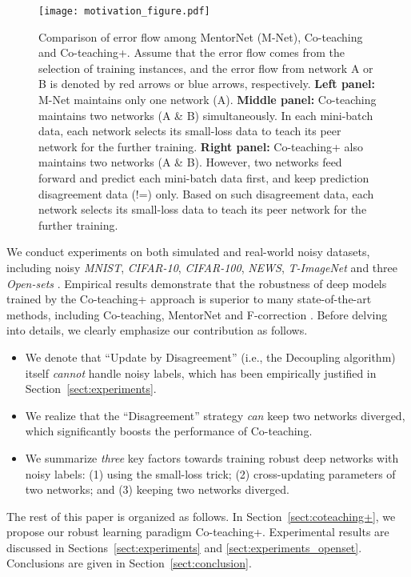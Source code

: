 \documentclass{article}
\begin{document}
\begin{figure}[!tp]
\centering
\texttt{[image: motivation\_figure.pdf]}
\caption{Comparison of error flow among MentorNet (M-Net), Co-teaching and Co-teaching+. Assume that the error flow comes from the selection of training instances, and the error flow from network A or B is denoted by red arrows or blue arrows, respectively. \textbf{Left panel:} M-Net maintains only one network (A). \textbf{Middle panel:}
Co-teaching maintains two networks (A \& B) simultaneously. In each mini-batch data, each network selects its small-loss data to teach its peer network for the further training. \textbf{Right panel:} Co-teaching+ also maintains two networks (A \& B). However, two networks feed forward and predict each mini-batch data first, and keep prediction disagreement data (!=) only. Based on such disagreement data, each network selects its small-loss data to teach its peer network for the further training.}
\label{fig:intuition-comp}
\end{figure}

We conduct experiments on both simulated and real-world noisy datasets, including noisy \textit{MNIST}, \textit{CIFAR-10}, \textit{CIFAR-100}, \textit{NEWS}, \textit{T-ImageNet} and three \textit{Open-sets} \cite{wang2018iterative}. Empirical results demonstrate that the robustness of deep models trained by the Co-teaching+ approach is superior to many state-of-the-art methods, including Co-teaching, MentorNet and F-correction \cite{patrini2017making}. Before delving into details, we clearly emphasize our contribution as follows.
\vspace{-5px}
\begin{itemize}
  \itemsep0em
  \item We denote that ``Update by Disagreement'' (i.e., the Decoupling algorithm) itself \textit{cannot} handle noisy labels, which has been empirically justified in Section~\ref{sect:experiments}.
  \item We realize that the ``Disagreement'' strategy \textit{can} keep two networks diverged, which significantly boosts the performance of Co-teaching.
  \item We summarize \textit{three} key factors towards training robust deep networks with noisy labels: (1) using the small-loss trick; (2) cross-updating parameters of two networks; and (3) keeping two networks diverged.
\end{itemize}

The rest of this paper is organized as follows. In Section~\ref{sect:coteaching+}, we propose our robust learning paradigm Co-teaching+. Experimental results are discussed in Sections~\ref{sect:experiments} and \ref{sect:experiments_openset}. Conclusions are given in Section~\ref{sect:conclusion}.
\end{document}
